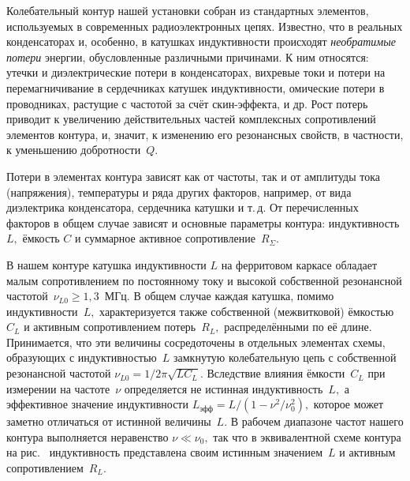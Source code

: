 Колебательный контур нашей установки собран из стандартных элементов,
используемых в современных радиоэлектронных цепях. Известно, что в реальных
конденсаторах и, особенно, в катушках индуктивности происходят 
\emph{необратимые потери} энергии, обусловленные различными причинами. К ним относятся: утечки и
диэлектрические потери в конденсаторах, вихревые токи и потери на
перемагничивание в сердечниках катушек индуктивности, омические потери в
проводниках, растущие с частотой за счёт скин-эффекта, и др. Рост
потерь приводит к увеличению действительных частей комплексных сопротивлений
элементов контура, и, значит, к изменению его резонансных свойств, в частности,
к уменьшению добротности~$Q$.

Потери в элементах контура зависят как от частоты, так и от амплитуды тока
(напряжения), температуры и ряда других факторов, например, от вида диэлектрика
конденсатора, сердечника катушки и т.\,д. От перечисленных факторов в общем случае
зависят и основные параметры контура: индуктивность $L,$ ёмкость $C$ и суммарное
активное сопротивление~$R_{\Sigma}.$

В нашем контуре катушка индуктивности $L$ на ферритовом каркасе обладает малым
сопротивлением по постоянному току и высокой собственной резонансной
частотой~$\nu_{L0}\ge1,3$~МГц. В общем случае каждая катушка, помимо индуктивности~$L,$ характеризуется также собственной (межвитковой) ёмкостью $C_L$ и активным
сопротивлением потерь~$R_L,$ распределёнными по её длине. Принимается, что эти
величины сосредоточены в отдельных элементах схемы, образующих с индуктивностью~$L$ 
замкнутую колебательную цепь с собственной резонансной частотой
$\nu_{L0}=1/2\pi\sqrt{LC_L}.$ Вследствие влияния ёмкости~$C_L$ при измерении на
частоте~$\nu$ определяется не истинная индуктивность~$L,$ а эффективное значение
индуктивности $L_{эфф}=L/(1-\nu^2/\nu_0^2),$ которое может заметно отличаться от
истинной величины~$L.$ В рабочем диапазоне частот нашего контура выполняется
неравенство $\nu \ll \nu_0,$ так что в эквивалентной схеме контура на рис.~
индуктивность представлена своим истинным значением~$L$ и активным
сопротивлением~$R_L.$

